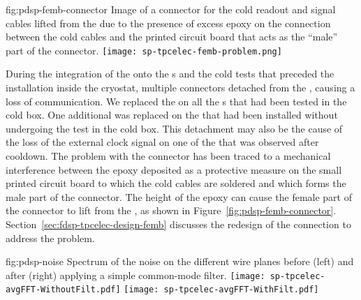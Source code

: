 \begin{dunefigure}
{fig:pdsp-femb-connector}
{Image of a connector for the cold readout and signal cables lifted from
the  due to the presence of excess epoxy on the 
connection between the cold cables and the printed circuit board
that acts as the ``male'' part of the connector.}
\texttt{[image: sp-tpcelec-femb-problem.png]}
\end{dunefigure}

\begin{comment}During the integration of the \dwords{femb} onto the \dword{apa}s 
and the cold tests that preceded the \dwords{apa} installation
inside the \dword{pdsp} cryostat a problem occurred %
on the 
connection between the cold readout and control cables and the
\dwords{femb}. In multiple cases the connector %
detached from
the \dword{femb} causing a loss of communication. 
\end{comment}
During the integration of the  onto the s 
and the cold tests that preceded the  installation
inside the  cryostat,  multiple connectors  
detached from
the , causing a loss of communication.  
We replaced the  %
on all the s that had been tested in the cold box. %
One additional  was 
replaced on the  that had been installed without undergoing 
the test in the cold box. This %
detachment may also be the cause
of the loss of the external clock signal on one of the 
that was observed after cooldown. %
%
The problem 
with the connector has been traced to a mechanical interference between 
the epoxy deposited as a protective measure on the small printed circuit
board to which the cold cables are soldered and which forms the 
male part of the connector. The height of the epoxy can cause 
the female part of the connector to lift from the ,
as shown in 
Figure~\ref{fig:pdsp-femb-connector}. %
Section~\ref{sec:fdsp-tpcelec-design-femb} discusses the redesign of the connection to address the problem.


\begin{dunefigure}
{fig:pdsp-noise}
{Spectrum of the noise on the different   wire planes before
(left) and after (right) applying a simple common-mode filter.}
\texttt{[image: sp-tpcelec-avgFFT-WithoutFilt.pdf]}
\texttt{[image: sp-tpcelec-avgFFT-WithFilt.pdf]}
\end{dunefigure}

